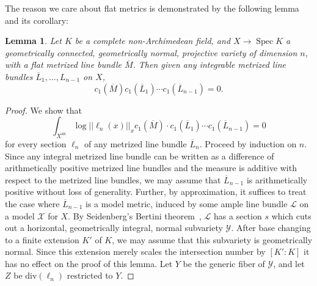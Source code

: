 \documentclass[times, doublespace]{amsart}
\numberwithin{equation}{section}
\theoremstyle{plain}
\newtheorem{lemma}[equation]{Lemma}
\theoremstyle{definition}
\DeclareMathOperator{\Spec}{Spec}
\DeclareMathOperator{\an}{an}
\renewcommand{\div}{\text{div}}
\newcommand{\cX}{\mathcal{X}}
\newcommand{\cY}{\mathcal{Y}}
\newcommand{\calL}{\mathcal{L}}
\begin{document}
The reason we care about flat metrics is demonstrated by the following lemma and its corollary:

\begin{lemma}\label{flatzeromeasure}
Let $K$ be a complete non-Archimedean field, and $X\to\Spec K$ a geometrically connected, geometrically normal, projective variety of dimension $n$, with a flat metrized line bundle $\overline M$. Then given any integrable metrized line bundles $\overline L_1,\dots, L_{n-1}$ on $X$,
\[c_1(\overline M)c_1(\overline L_1)\cdots c_1(\overline L_{n-1})=0.\]
\end{lemma}

\begin{proof}
We show that 
\[\int_{X^{\an}}\log||\ell_n(x)||_xc_1(\overline M)\cdot c_1(\overline L_1)\cdots c_1(\overline L_{n-1})=0\]
    for every section $\ell_n$ of any metrized line bundle $\overline L_n$. Proceed by induction on $n$. Since any integral metrized line bundle can be written as a difference of arithmetically positive metrized line bundles and the measure is additive with respect to the metrized line bundles, we may assume that $\overline L_{n-1}$ is arithmetically positive without loss of generality. Further, by approximation, it suffices to treat the case where $\overline L_{n-1}$ is a model metric, induced by some ample line bundle $\calL$ on a model $\cX$ for $X$. By Seidenberg's Bertini theorem~\cite[Theorem 7']{Seidenberg}, $\calL$ has a section $s$ which cuts out a horizontal, geometrically integral, normal subvariety $\cY$. After base changing to a finite extension $K'$ of $K$, we may assume that this subvariety is geometrically normal. Since this extension merely scales the intersection number by $[K':K]$ it has no effect on the proof of this lemma. Let $Y$ be the generic fiber of $\cY$, and let $Z$ be $\div(\ell_n)$ restricted to $Y$.


\end{proof}
\end{document}
